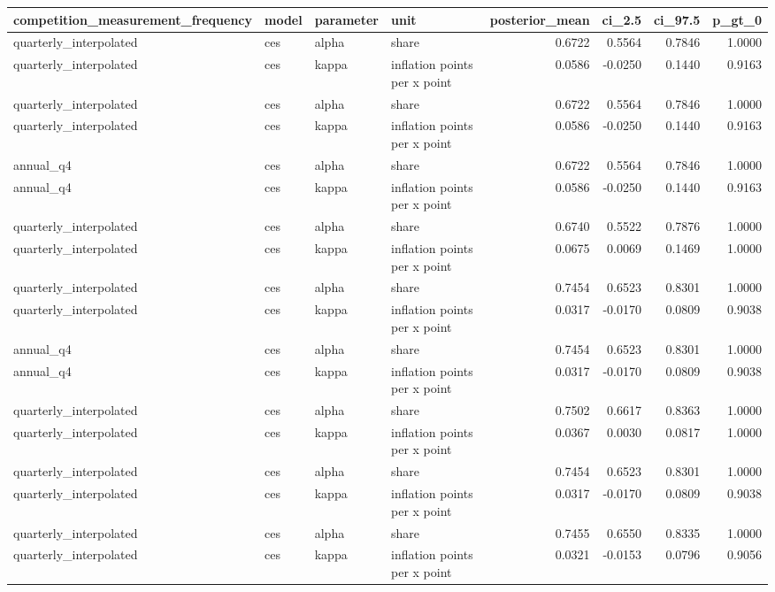 \begin{tabular}{llllrrrr}
\toprule
competition\_measurement\_frequency & model & parameter & unit & posterior\_mean & ci\_2.5 & ci\_97.5 & p\_gt\_0 \\
\midrule
quarterly\_interpolated & ces & alpha & share & 0.6722 & 0.5564 & 0.7846 & 1.0000 \\
quarterly\_interpolated & ces & kappa & inflation points per x point & 0.0586 & -0.0250 & 0.1440 & 0.9163 \\
quarterly\_interpolated & ces & alpha & share & 0.6722 & 0.5564 & 0.7846 & 1.0000 \\
quarterly\_interpolated & ces & kappa & inflation points per x point & 0.0586 & -0.0250 & 0.1440 & 0.9163 \\
annual\_q4 & ces & alpha & share & 0.6722 & 0.5564 & 0.7846 & 1.0000 \\
annual\_q4 & ces & kappa & inflation points per x point & 0.0586 & -0.0250 & 0.1440 & 0.9163 \\
quarterly\_interpolated & ces & alpha & share & 0.6740 & 0.5522 & 0.7876 & 1.0000 \\
quarterly\_interpolated & ces & kappa & inflation points per x point & 0.0675 & 0.0069 & 0.1469 & 1.0000 \\
quarterly\_interpolated & ces & alpha & share & 0.7454 & 0.6523 & 0.8301 & 1.0000 \\
quarterly\_interpolated & ces & kappa & inflation points per x point & 0.0317 & -0.0170 & 0.0809 & 0.9038 \\
annual\_q4 & ces & alpha & share & 0.7454 & 0.6523 & 0.8301 & 1.0000 \\
annual\_q4 & ces & kappa & inflation points per x point & 0.0317 & -0.0170 & 0.0809 & 0.9038 \\
quarterly\_interpolated & ces & alpha & share & 0.7502 & 0.6617 & 0.8363 & 1.0000 \\
quarterly\_interpolated & ces & kappa & inflation points per x point & 0.0367 & 0.0030 & 0.0817 & 1.0000 \\
quarterly\_interpolated & ces & alpha & share & 0.7454 & 0.6523 & 0.8301 & 1.0000 \\
quarterly\_interpolated & ces & kappa & inflation points per x point & 0.0317 & -0.0170 & 0.0809 & 0.9038 \\
quarterly\_interpolated & ces & alpha & share & 0.7455 & 0.6550 & 0.8335 & 1.0000 \\
quarterly\_interpolated & ces & kappa & inflation points per x point & 0.0321 & -0.0153 & 0.0796 & 0.9056 \\

\end{tabular}

